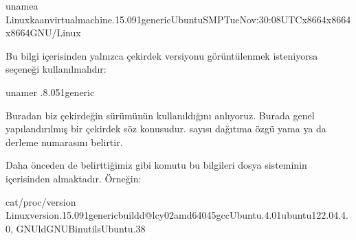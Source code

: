 \documentclass[a4paper,10pt,turkish]{sphinxmanual}
\begin{document}
\begin{sphinxVerbatim}[commandchars=\\\{\}]
\PYGZdl{}uname\PYGZhy{}a
Linuxkaan\PYGZhy{}virtual\PYGZhy{}machine.15.0\PYGZhy{}91\PYGZhy{}genericUbuntuSMPTueNov:30:08UTCx86\PYGZus{}64x86\PYGZus{}64x86\PYGZus{}64GNU/Linux
\end{sphinxVerbatim}

\sphinxAtStartPar
Bu bilgi içerisinden yalnızca çekirdek versiyonu görüntülenmek isteniyorsa  seçeneği
kullanılmalıdır:

\begin{sphinxVerbatim}[commandchars=\\\{\}]
\PYGZdl{}uname\PYGZhy{}r
.8.0\PYGZhy{}51\PYGZhy{}generic
\end{sphinxVerbatim}

\sphinxAtStartPar
Buradan biz çekirdeğin  sürümünün kullanıldığını anlıyoruz. Burada genel yapılandırılmış bir
çekirdek söz konusudur.  sayısı dağıtıma özgü yama ya da derleme numarasını belirtir.

\sphinxAtStartPar
Daha önceden de belirttiğimiz gibi  komutu bu bilgileri  dosya sisteminin içerisinden
almaktadır. Örneğin:

\begin{sphinxVerbatim}[commandchars=\\\{\}]
\PYGZdl{}cat/proc/version
Linuxversion.15.0\PYGZhy{}91\PYGZhy{}genericbuildd@lcy02\PYGZhy{}amd64\PYGZhy{}045gccUbuntu.4.0\PYGZhy{}1ubuntu1\PYGZti{}22.04.4.0,
GNUldGNUBinutilsUbuntu.38
\end{sphinxVerbatim}
\end{document}
